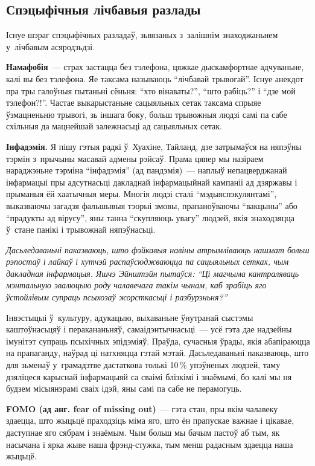 \subsection*{Спэцыфічныя лічбавыя разлады}

Існуе шэраг спэцыфічных разладаў, зьвязаных з~залішнім знаходжаньнем у~лічбавым асяродзьдзі.

\textbf{Намафобія}~--- страх застацца без тэлефона, цяжкае дыскамфортнае адчуваньне, калі вы без тэлефона. Яе таксама называюць ``лічбавай трывогай''. Існуе анекдот пра тры галоўныя пытаньні сёньня: ``хто вінаваты?'', ``што рабіць?'' і ``дзе мой тэлефон?!''. Частае выкарыстаньне сацыяльных сетак таксама спрыяе ўзмацненьню трывогі, зь іншага боку, больш трывожныя людзі самі па сабе схільныя да мацнейшай залежнасьці ад сацыяльных сетак.

\textbf{Інфадэмія.} Я пішу гэтыя радкі ў~Хуахіне, Тайланд, дзе затрымаўся на няпэўны тэрмін з~прычыны масавай адмены рэйсаў. Прама цяпер мы назіраем нараджэньне тэрміна ``інфадэмія'' (ад пандэмія)~--- наплыў непацверджанай інфармацыі пры адсутнасьці дакладнай інфармацыйнай кампаніі ад дзяржавы і прыманыя ёй хаатычныя меры. Многія людзі сталі ``мэдыяспэкулянтамі'', выказваючы загадзя фальшывыя тэорыі змовы, прапаноўваючы ``вакцыны'' або ``прадукты ад вірусу'', яны танна ``скупляюць увагу'' людзей, якія знаходзяцца ў~стане панікі і трывожнай няпэўнасьці.

\emph{Дасьледаваньні паказваюць, што фэйкавыя навіны атрымліваюць нашмат больш рэпостаў і лайкаў і хутчэй распаўсюджваюцца па сацыяльных сетках, чым дакладная інфармацыя. Яшчэ Эйнштэйн пытаўся: ``Ці магчыма кантраляваць мэнтальную эвалюцыю роду чалавечага такім чынам, каб зрабіць яго ўстойлівым супраць псыхозаў жорсткасьці і разбурэньня?''} 

Інвэстыцыі ў~культуру, адукацыю, выхаваньне ўнутранай сыстэмы каштоўнасьцяў і перакананьняў, самаідэнтычнасьці~--- усё гэта дае надзейны імунітэт супраць псыхічных эпідэміяў. Праўда, сучасныя ўрады, якія абапіраюцца на прапаганду, наўрад ці натхняцца гэтай мэтай. Дасьледаваньні паказваюць, што для зьменаў у~грамадзтве дастаткова толькі 10\,\% упэўненых людзей, таму дзяліцеся карыснай інфармацыяй са сваімі блізкімі і знаёмымі, бо калі мы ня будзем місыянэрамі сваіх ідэй, яны самі па сабе не перамогуць.

\textbf{FOMO (ад анг. fear of missing out)}~--- гэта стан, пры якім чалавеку здаецца, што жыцьцё праходзіць міма яго, што ён прапускае важнае і цікавае, даступнае яго сябрам і знаёмым. Чым больш мы бачым пастоў аб тым, як насычана і ярка жыве наша фрэнд-стужка, тым менш радасным здаецца наша жыцьцё.

